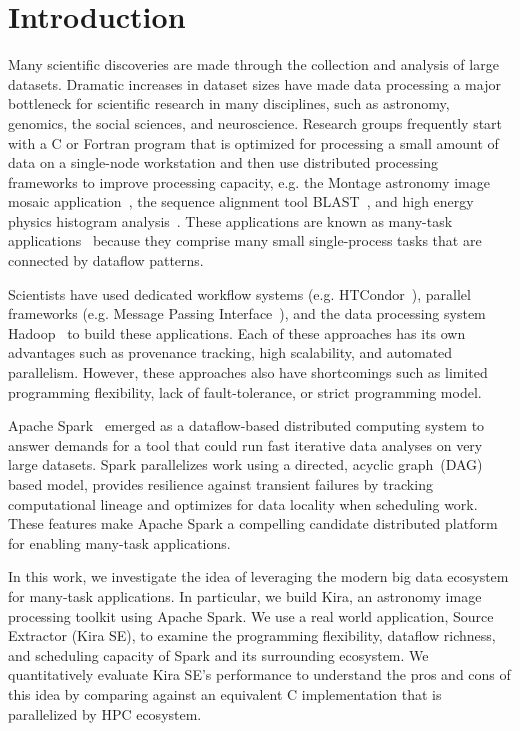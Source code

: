 \documentclass[10pt, conference, compsocconf]{IEEEtran}
\begin{document}
\section{Introduction}
Many scientific discoveries are made through the collection and analysis of large datasets.
Dramatic increases in dataset sizes have made data processing a major bottleneck for scientific research in many disciplines, such as astronomy, genomics, the social sciences, and neuroscience.
Research groups frequently start with a C or Fortran program that is optimized for processing a small amount of data on a single-node workstation and then use distributed processing frameworks to improve processing capacity, e.g. the Montage astronomy image mosaic application~\cite{jacob09},  the sequence alignment tool BLAST~\cite{altschul90}, and high energy physics histogram analysis~\cite{ekanayake08}.
These applications are known as many-task applications~\cite{raicu08} because they comprise many small single-process tasks that are connected by dataflow patterns.

Scientists have used dedicated workflow systems (e.g. HTCondor~\cite{litzkow88}), parallel frameworks (e.g. Message Passing Interface~\cite{gropp96}), and  the data processing system Hadoop~\cite{HADOOP}  to build these applications. Each of these approaches has its own advantages such as provenance tracking, high scalability, and automated parallelism. However, these approaches also have shortcomings such as limited programming flexibility, lack of fault-tolerance, or strict programming model.


Apache Spark~\cite{zaharia12} emerged as a dataflow-based distributed computing system
to answer demands for a tool that could run fast iterative data analyses on very large datasets.
Spark parallelizes work using a directed, acyclic graph~(DAG) based model,
provides resilience against transient failures by tracking computational lineage
and optimizes for data locality when scheduling work.
These features make Apache Spark a compelling candidate distributed platform for enabling many-task applications.

In this work, we investigate the idea of leveraging the modern big data ecosystem for many-task applications.
In particular, we build Kira, an astronomy image processing toolkit using Apache Spark.
We use a real world application, Source Extractor (Kira SE), to examine the programming flexibility, dataflow richness,
and scheduling capacity of Spark and its surrounding ecosystem. 
We quantitatively evaluate Kira SE's performance to understand the pros and cons of this idea by comparing against
an equivalent C implementation that is parallelized by HPC ecosystem.
\end{document}

